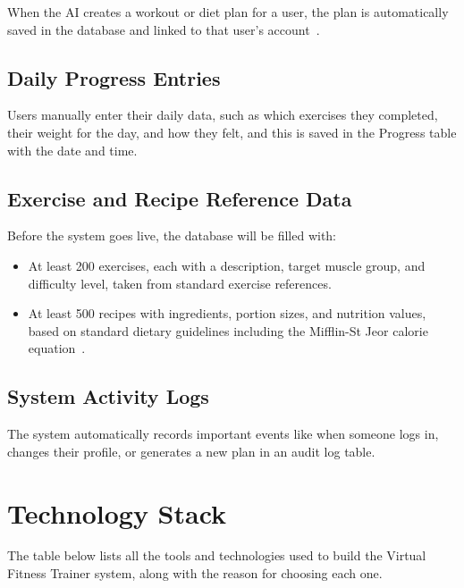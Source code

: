 \documentclass[12pt,a4paper]{article}
\begin{document}
When the AI creates a workout or diet plan for a user, the plan is automatically saved in
the database and linked to that user's account~\cite{srs}.

\subsection{Daily Progress Entries}

Users manually enter their daily data, such as which exercises they completed, their
weight for the day, and how they felt, and this is saved in the Progress table with the
date and time.

\subsection{Exercise and Recipe Reference Data}

Before the system goes live, the database will be filled with:

\begin{itemize}[leftmargin=*]
  \item At least 200 exercises, each with a description, target muscle group, and
  difficulty level, taken from standard exercise references.
  \item At least 500 recipes with ingredients, portion sizes, and nutrition values,
  based on standard dietary guidelines including the Mifflin-St Jeor calorie
  equation~\cite{mifflin}.
\end{itemize}

\subsection{System Activity Logs}

The system automatically records important events like when someone logs in, changes
their profile, or generates a new plan in an audit log table.

\section{Technology Stack}
The table below lists all the tools and technologies used to build the Virtual Fitness Trainer system, along with the reason for choosing each one.
\end{document}
